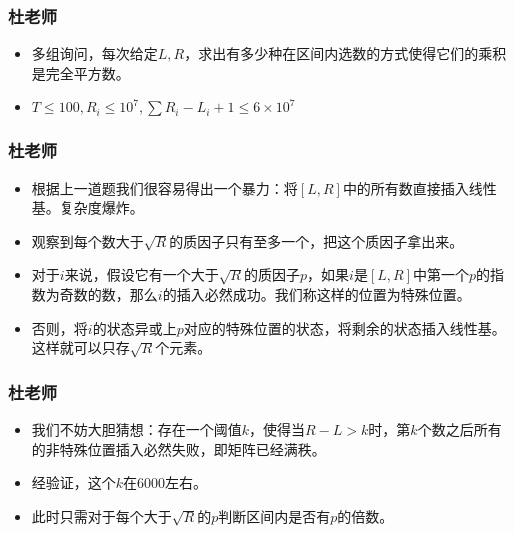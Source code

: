\documentclass{beamer}
\begin{document}
\begin{frame}
    \frametitle{杜老师}
    \begin{itemize}
        \item 多组询问，每次给定$L, R$，求出有多少种在区间内选数的方式使得它们的乘积是完全平方数。
        \item $T\leq 100, R_i\leq 10^7, \sum R_i - L_i + 1\leq 6\times 10^7$
    \end{itemize}
\end{frame}

\begin{frame}
    \frametitle{杜老师}
    \begin{itemize}
        \item 根据上一道题我们很容易得出一个暴力：将$[L, R]$中的所有数直接插入线性基。复杂度爆炸。
        \item 观察到每个数大于$\sqrt R$的质因子只有至多一个，把这个质因子拿出来。
        \item 对于$i$来说，假设它有一个大于$\sqrt R$的质因子$p$，如果$i$是$[L, R]$中第一个$p$的指数为奇数的数，那么$i$的插入必然成功。我们称这样的位置为特殊位置。
        \item 否则，将$i$的状态异或上$p$对应的特殊位置的状态，将剩余的状态插入线性基。这样就可以只存$\sqrt R$个元素。
    \end{itemize}
\end{frame}

\begin{frame}
    \frametitle{杜老师}
    \begin{itemize}
        \item 我们不妨大胆猜想：存在一个阈值$k$，使得当$R - L > k$时，第$k$个数之后所有的非特殊位置插入必然失败，即矩阵已经满秩。
        \item 经验证，这个$k$在$6000$左右。
        \item 此时只需对于每个大于$\sqrt R$的$p$判断区间内是否有$p$的倍数。
    \end{itemize}
\end{frame}
\end{document}
